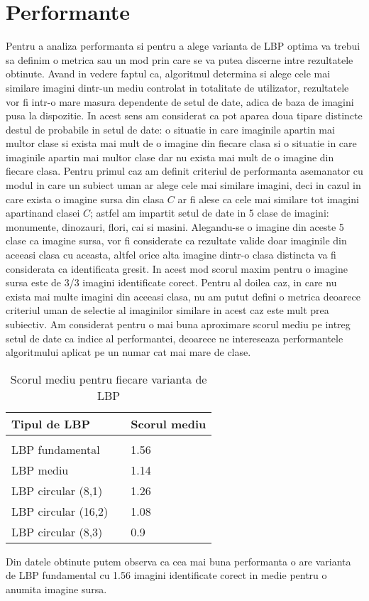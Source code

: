 \section{Performante}

\quad Pentru a analiza performanta si pentru a alege varianta de LBP
optima va trebui sa definim o metrica sau un mod prin care se va putea
discerne intre rezultatele obtinute. Avand in vedere faptul ca, algoritmul
determina si alege cele mai similare imagini dintr-un mediu controlat
in totalitate de utilizator, rezultatele vor fi intr-o mare masura
dependente de setul de date, adica de baza de imagini pusa la dispozitie.
In acest sens am considerat ca pot aparea doua tipare distincte destul 
de probabile in setul de date: o situatie in care imaginile apartin mai multor clase si exista mai mult de o imagine din fiecare clasa si o 
situatie in care imaginile apartin mai multor clase dar nu exista mai mult de o imagine din fiecare clasa. Pentru primul caz am definit 
criteriul de performanta asemanator cu modul in care un subiect uman
ar alege cele mai similare imagini, deci in cazul in care exista o imagine
sursa din clasa $C$ ar fi alese ca cele mai similare tot imagini 
apartinand clasei $C$; astfel am impartit setul de date in 5 clase de
imagini: {monumente, dinozauri, flori, cai si masini}. Alegandu-se
o imagine din aceste 5 clase ca imagine sursa, vor fi considerate ca
rezultate valide doar imaginile din aceeasi clasa cu aceasta, altfel orice alta imagine dintr-o clasa distincta va fi considerata ca identificata gresit. In acest mod scorul maxim pentru o imagine sursa
este de 3/3 imagini identificate corect.
\quad Pentru al doilea caz, in care nu exista mai multe imagini din aceeasi clasa, nu am putut defini o metrica deoarece criteriul uman de
selectie al imaginilor similare in acest caz este mult prea subiectiv.
Am considerat pentru o mai buna aproximare scorul mediu pe intreg setul de date ca indice al performantei, deoarece ne intereseaza performantele
algoritmului aplicat pe un numar cat mai mare de clase.

\begin{table}[H]
	\centering
	\begin{tabular}{|l|l|l|}
		\hline
		Tipul de LBP        &  & Scorul mediu \\ \hline
		&  &              \\ \hline
		LBP fundamental     &  & 1.56         \\ \hline
		LBP mediu           &  & 1.14         \\ \hline
		LBP circular (8,1)  &  & 1.26         \\ \hline
		LBP circular (16,2) &  & 1.08         \\ \hline
		LBP circular (8,3)  &  & 0.9          \\ \hline
	\end{tabular}
	\caption{Scorul mediu pentru fiecare varianta de LBP}
\end{table}


\quad Din datele obtinute putem observa ca cea mai buna performanta o are varianta de LBP fundamental cu 1.56 imagini identificate corect in medie pentru o anumita imagine sursa.
